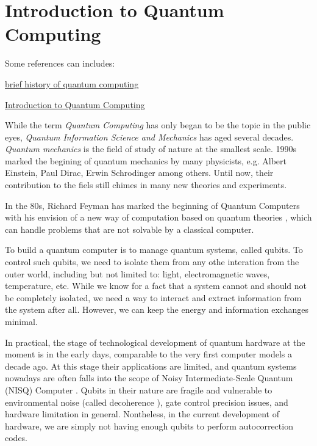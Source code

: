 \section{Introduction to Quantum Computing} \label{Sec: Introduction to Quantum Computing}
\begin{framed}
    Some references can includes:

    \href{https://www.sri.com/story/a-brief-introduction-to-quantum-computing/#:~:text=Quantum%20computing%20is%20generally%20viewed,the%20atomic%20and%20subatomic%20level.}{brief history of quantum computing}

    \href{https://www.intechopen.com/chapters/73811}{Introduction to Quantum Computing}
\end{framed}

While the term \emph{Quantum Computing} has only began to be the topic in the public eyes, \emph{Quantum Information Science and Mechanics} has aged several decades.
\emph{Quantum mechanics} is the field of study of nature at the smallest scale.
1990s marked the begining of quantum mechanics by many physicists, e.g. Albert Einstein, Paul Dirac, Erwin Schrodinger among others.
Until now, their contribution to the fiels still chimes in many new theories and experiments.

In the 80s, Richard Feyman has marked the beginning of Quantum Computers with his envision of a new way of computation based on quantum theories \cite{feynmanSimulatingPhysicsComputers1982}, which can handle problems that are not solvable by a classical computer.

To build a quantum computer is to manage quantum systems, called qubits.
To control such qubits, we need to isolate them from any othe interation from the outer world, including but not limited to: light, electromagnetic waves, temperature, etc.
While we know for a fact that a system cannot and should not be completely isolated, we need a way to interact and extract information from the system after all.
However, we can keep the energy and information exchanges minimal.

In practical, the stage of technological development of quantum hardware at the moment is in the early days, comparable to the very first computer models a decade ago.
At this stage their applications are limited, and quantum systems nowadays are often falls into the scope of Noisy Intermediate-Scale Quantum (NISQ) Computer \cite{brooksQuantumSupremacyHunt2019}.
Qubits in their nature are fragile and vulnerable to environmental noise (called decoherence \cite{brooksQuantumSupremacyHunt2019}), gate control precision issues, and hardware limitation in general.
Nontheless, in the current development of hardware, we are simply not having enough qubits to perform autocorrection codes.

